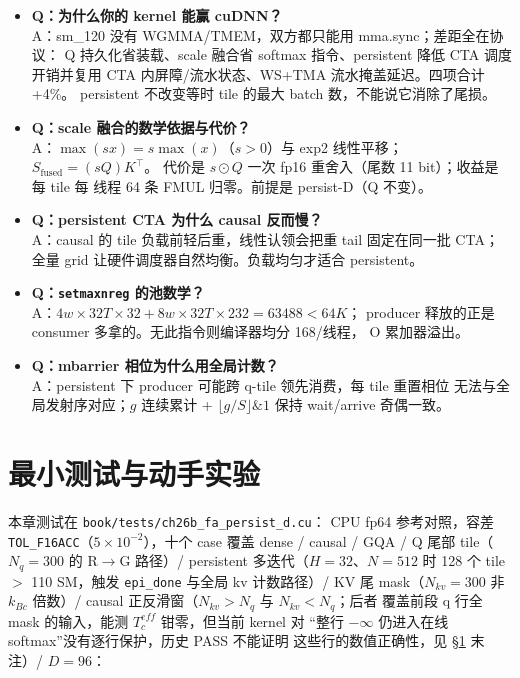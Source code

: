 \begin{itemize}[itemsep=1pt]
  \item \textbf{Q：为什么你的 kernel 能赢 cuDNN？}\\
        A：sm\_120 没有 WGMMA/TMEM，双方都只能用 mma.sync；差距全在协议：
        Q 持久化省装载、scale 融合省 softmax 指令、persistent 降低 CTA
        调度开销并复用 CTA 内屏障/流水状态、WS+TMA 流水掩盖延迟。四项合计 +4\%。
        persistent 不改变等时 tile 的最大 batch 数，不能说它消除了尾损。
  \item \textbf{Q：scale 融合的数学依据与代价？}\\
        A：$\max(sx)=s\max(x)$（$s>0$）与 exp2 线性平移；$S_{\text{fused}}=(sQ)K^\top$。
        代价是 $s\odot Q$ 一次 fp16 重舍入（尾数 11 bit）；收益是每 tile 每
        线程 64 条 FMUL 归零。前提是 persist-D（Q 不变）。
  \item \textbf{Q：persistent CTA 为什么 causal 反而慢？}\\
        A：causal 的 tile 负载前轻后重，线性认领会把重 tail 固定在同一批
        CTA；全量 grid 让硬件调度器自然均衡。负载均匀才适合 persistent。
  \item \textbf{Q：\texttt{setmaxnreg} 的池数学？}\\
        A：$4w\times 32T\times 32 + 8w\times 32T\times 232 = 63488 < 64K$；
        producer 释放的正是 consumer 多拿的。无此指令则编译器均分 168/线程，
        O 累加器溢出。
  \item \textbf{Q：mbarrier 相位为什么用全局计数？}\\
        A：persistent 下 producer 可能跨 q-tile 领先消费，每 tile 重置相位
        无法与全局发射序对应；$g$ 连续累计 + $\lfloor g/S\rfloor\&1$ 保持
        wait/arrive 奇偶一致。
\end{itemize}

\section{最小测试与动手实验}\label{sec:26b-test}

本章测试在 \texttt{book/tests/ch26b\_\allowbreak{}fa\_\allowbreak{}persist\_\allowbreak{}d.cu}：
CPU fp64 参考对照，容差 \texttt{TOL\_F16ACC}（$5\times 10^{-2}$），十个 case 覆盖
dense / causal / GQA / Q 尾部 tile（$N_q{=}300$ 的 R$\to$G 路径）/
persistent 多迭代（$H{=}32$、$N{=}512$ 时 128 个 tile $>$ 110 SM，触发
\texttt{epi\_done} 与全局 kv 计数路径）/ KV 尾 mask（$N_{kv}{=}300$ 非
$k_{Bc}$ 倍数）/ causal 正反滑窗（$N_{kv}{>}N_q$ 与 $N_{kv}{<}N_q$；后者
覆盖前段 q 行全 mask 的输入，能测 $T_c^{eff}$ 钳零，但当前 kernel 对
“整行 $-\infty$ 仍进入在线 softmax”没有逐行保护，历史 PASS 不能证明
这些行的数值正确性，见 \S\ref{sec:26b-test} 末注）/ $D{=}96$：

